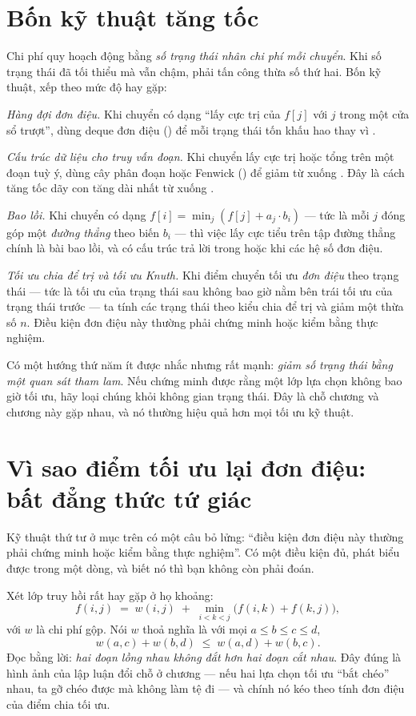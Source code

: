 \documentclass[../../algorithm.tex]{subfiles}
\begin{document}
\section{Bốn kỹ thuật tăng tốc}

Chi phí quy hoạch động bằng \emph{số trạng thái nhân chi phí mỗi chuyển}. Khi số trạng thái đã tối thiểu mà vẫn chậm, phải tấn công thừa số thứ hai. Bốn kỹ thuật, xếp theo mức độ hay gặp:

\emph{Hàng đợi đơn điệu.} Khi chuyển có dạng ``lấy cực trị của \(f[j]\) với \(j\) trong một cửa sổ trượt'', dùng deque đơn điệu () để mỗi trạng thái tốn  khấu hao thay vì .

\emph{Cấu trúc dữ liệu cho truy vấn đoạn.} Khi chuyển lấy cực trị hoặc tổng trên một đoạn tuỳ ý, dùng cây phân đoạn hoặc Fenwick () để giảm từ  xuống . Đây là cách tăng tốc dãy con tăng dài nhất từ  xuống .

\emph{Bao lồi.} Khi chuyển có dạng \(f[i] = \min_j (f[j] + a_j\cdot b_i)\) --- tức là mỗi \(j\) đóng góp một \emph{đường thẳng} theo biến \(b_i\) --- thì việc lấy cực tiểu trên tập đường thẳng chính là bài bao lồi, và có cấu trúc trả lời trong  hoặc  khi các hệ số đơn điệu.

\emph{Tối ưu chia để trị và tối ưu Knuth.} Khi điểm chuyển tối ưu \emph{đơn điệu} theo trạng thái --- tức là tối ưu của trạng thái sau không bao giờ nằm bên trái tối ưu của trạng thái trước --- ta tính các trạng thái theo kiểu chia để trị và giảm một thừa số \(n\). Điều kiện đơn điệu này thường phải chứng minh hoặc kiểm bằng thực nghiệm.

Có một hướng thứ năm ít được nhắc nhưng rất mạnh: \emph{giảm số trạng thái bằng một quan sát tham lam}. Nếu chứng minh được rằng một lớp lựa chọn không bao giờ tối ưu, hãy loại chúng khỏi không gian trạng thái. Đây là chỗ chương  và chương này gặp nhau, và nó thường hiệu quả hơn mọi tối ưu kỹ thuật.


\section{Vì sao điểm tối ưu lại đơn điệu: bất đẳng thức tứ giác}

Kỹ thuật thứ tư ở mục trên có một câu bỏ lửng: ``điều kiện đơn điệu này thường phải chứng minh hoặc kiểm bằng thực nghiệm''. Có một điều kiện đủ, phát biểu được trong một dòng, và biết nó thì bạn không còn phải đoán.

Xét lớp truy hồi rất hay gặp ở họ khoảng:
\[ f(i,j) \;=\; w(i,j) \;+\; \min_{i<k<j}\big(f(i,k)+f(k,j)\big), \]
với \(w\) là chi phí gộp. Nói \(w\) thoả  nghĩa là với mọi \(a\le b\le c\le d\),
\[ w(a,c)+w(b,d)\;\le\;w(a,d)+w(b,c). \]
Đọc bằng lời: \emph{hai đoạn lồng nhau không đắt hơn hai đoạn cắt nhau}. Đây đúng là hình ảnh của lập luận đổi chỗ ở chương  --- nếu hai lựa chọn tối ưu ``bắt chéo'' nhau, ta gỡ chéo được mà không làm tệ đi --- và chính nó kéo theo tính đơn điệu của điểm chia tối ưu.
\end{document}

